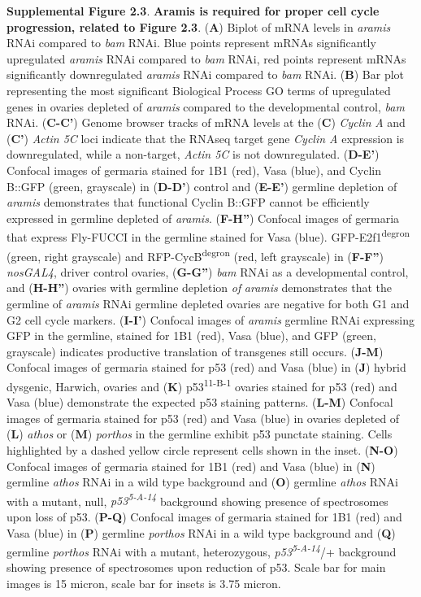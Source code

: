 \documentclass[12pt,twoside]{reedthesis}
\begin{document}
\textbf{Supplemental Figure 2.3}. \textbf{Aramis is required for proper cell cycle
progression, related to Figure 2.3}. (\textbf{A}) Biplot of mRNA levels in
\emph{aramis} RNAi compared to \emph{bam} RNAi. Blue points represent mRNAs
significantly upregulated \emph{aramis} RNAi compared to \emph{bam} RNAi, red
points represent mRNAs significantly downregulated \emph{aramis} RNAi
compared to \emph{bam} RNAi. (\textbf{B}) Bar plot representing the most
significant Biological Process GO terms of upregulated genes in ovaries
depleted of \emph{aramis} compared to the developmental control, \emph{bam} RNAi.
(\textbf{C-C'}) Genome browser tracks of mRNA levels at the (\textbf{C}) \emph{Cyclin}
\emph{A} and (\textbf{C'}) \emph{Actin 5C} loci indicate that the RNAseq target gene
\emph{Cyclin A} expression is downregulated, while a non-target, \emph{Actin 5C}
is not downregulated. (\textbf{D-E'}) Confocal images of germaria stained for
1B1 (red), Vasa (blue), and Cyclin B::GFP (green, grayscale) in
(\textbf{D-D'}) control and (\textbf{E-E'}) germline depletion of \emph{aramis}
demonstrates that functional Cyclin B::GFP cannot be efficiently
expressed in germline depleted of \emph{aramis}. (\textbf{F-H''}) Confocal images
of germaria that express Fly-FUCCI in the germline stained for Vasa
(blue). GFP-E2f1\textsuperscript{degron} (green, right grayscale) and RFP-CycB\textsuperscript{degron}
(red, left grayscale) in (\textbf{F-F''}) \emph{nosGAL4}, driver control ovaries,
(\textbf{G-G''}) \emph{bam} RNAi as a developmental control, and (\textbf{H-H''})
ovaries with germline depletion \emph{of} \emph{aramis} demonstrates that the
germline of \emph{aramis} RNAi germline depleted ovaries are negative for
both G1 and G2 cell cycle markers. (\textbf{I-I'}) Confocal images of
\emph{aramis} germline RNAi expressing GFP in the germline, stained for 1B1
(red), Vasa (blue), and GFP (green, grayscale) indicates productive
translation of transgenes still occurs. (\textbf{J-M}) Confocal images of
germaria stained for p53 (red) and Vasa (blue) in (\textbf{J}) hybrid
dysgenic, Harwich, ovaries and (\textbf{K}) p53\textsuperscript{11-B-1} ovaries stained for
p53 (red) and Vasa (blue) demonstrate the expected p53 staining
patterns. (\textbf{L-M}) Confocal images of germaria stained for p53 (red)
and Vasa (blue) in ovaries depleted of (\textbf{L}) \emph{athos} or (\textbf{M})
\emph{porthos} in the germline exhibit p53 punctate staining. Cells
highlighted by a dashed yellow circle represent cells shown in the
inset. (\textbf{N-O}) Confocal images of germaria stained for 1B1 (red) and
Vasa (blue) in (\textbf{N}) germline \emph{athos} RNAi in a wild type background
and (\textbf{O}) germline \emph{athos} RNAi with a mutant, null, \emph{p53\textsuperscript{5-A-14}}
background showing presence of spectrosomes upon loss of p53. (\textbf{P-Q})
Confocal images of germaria stained for 1B1 (red) and Vasa (blue) in
(\textbf{P}) germline \emph{porthos} RNAi in a wild type background and (\textbf{Q})
germline \emph{porthos} RNAi with a mutant, heterozygous, \emph{p53\textsuperscript{5-A-14}}/+
background showing presence of spectrosomes upon reduction of p53. Scale
bar for main images is 15 micron, scale bar for insets is 3.75 micron.
\end{document}

